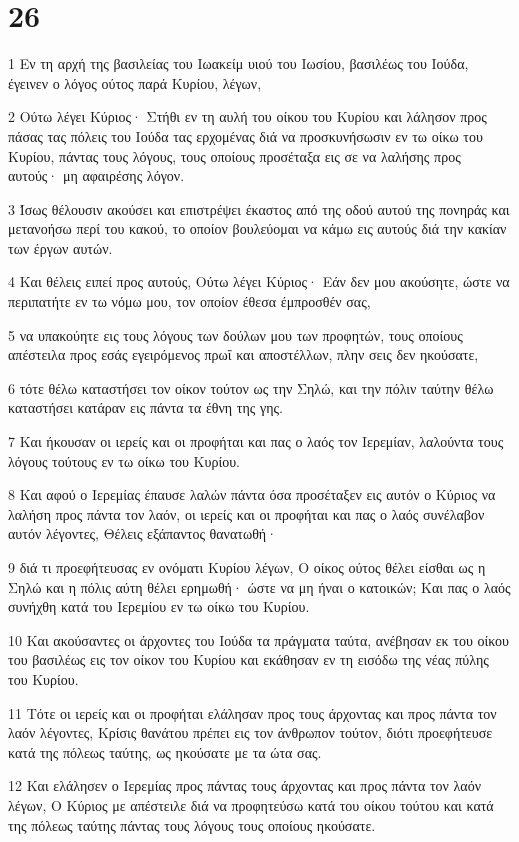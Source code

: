 \chapter{26}

\par 1 Εν τη αρχή της βασιλείας του Ιωακείμ υιού του Ιωσίου, βασιλέως του Ιούδα, έγεινεν ο λόγος ούτος παρά Κυρίου, λέγων,
\par 2 Ούτω λέγει Κύριος· Στήθι εν τη αυλή του οίκου του Κυρίου και λάλησον προς πάσας τας πόλεις του Ιούδα τας ερχομένας διά να προσκυνήσωσιν εν τω οίκω του Κυρίου, πάντας τους λόγους, τους οποίους προσέταξα εις σε να λαλήσης προς αυτούς· μη αφαιρέσης λόγον.
\par 3 Ίσως θέλουσιν ακούσει και επιστρέψει έκαστος από της οδού αυτού της πονηράς και μετανοήσω περί του κακού, το οποίον βουλεύομαι να κάμω εις αυτούς διά την κακίαν των έργων αυτών.
\par 4 Και θέλεις ειπεί προς αυτούς, Ούτω λέγει Κύριος· Εάν δεν μου ακούσητε, ώστε να περιπατήτε εν τω νόμω μου, τον οποίον έθεσα έμπροσθέν σας,
\par 5 να υπακούητε εις τους λόγους των δούλων μου των προφητών, τους οποίους απέστειλα προς εσάς εγειρόμενος πρωΐ και αποστέλλων, πλην σεις δεν ηκούσατε,
\par 6 τότε θέλω καταστήσει τον οίκον τούτον ως την Σηλώ, και την πόλιν ταύτην θέλω καταστήσει κατάραν εις πάντα τα έθνη της γης.
\par 7 Και ήκουσαν οι ιερείς και οι προφήται και πας ο λαός τον Ιερεμίαν, λαλούντα τους λόγους τούτους εν τω οίκω του Κυρίου.
\par 8 Και αφού ο Ιερεμίας έπαυσε λαλών πάντα όσα προσέταξεν εις αυτόν ο Κύριος να λαλήση προς πάντα τον λαόν, οι ιερείς και οι προφήται και πας ο λαός συνέλαβον αυτόν λέγοντες, Θέλεις εξάπαντος θανατωθή·
\par 9 διά τι προεφήτευσας εν ονόματι Κυρίου λέγων, Ο οίκος ούτος θέλει είσθαι ως η Σηλώ και η πόλις αύτη θέλει ερημωθή· ώστε να μη ήναι ο κατοικών; Και πας ο λαός συνήχθη κατά του Ιερεμίου εν τω οίκω του Κυρίου.
\par 10 Και ακούσαντες οι άρχοντες του Ιούδα τα πράγματα ταύτα, ανέβησαν εκ του οίκου του βασιλέως εις τον οίκον του Κυρίου και εκάθησαν εν τη εισόδω της νέας πύλης του Κυρίου.
\par 11 Τότε οι ιερείς και οι προφήται ελάλησαν προς τους άρχοντας και προς πάντα τον λαόν λέγοντες, Κρίσις θανάτου πρέπει εις τον άνθρωπον τούτον, διότι προεφήτευσε κατά της πόλεως ταύτης, ως ηκούσατε με τα ώτα σας.
\par 12 Και ελάλησεν ο Ιερεμίας προς πάντας τους άρχοντας και προς πάντα τον λαόν λέγων, Ο Κύριος με απέστειλε διά να προφητεύσω κατά του οίκου τούτου και κατά της πόλεως ταύτης πάντας τους λόγους τους οποίους ηκούσατε.
